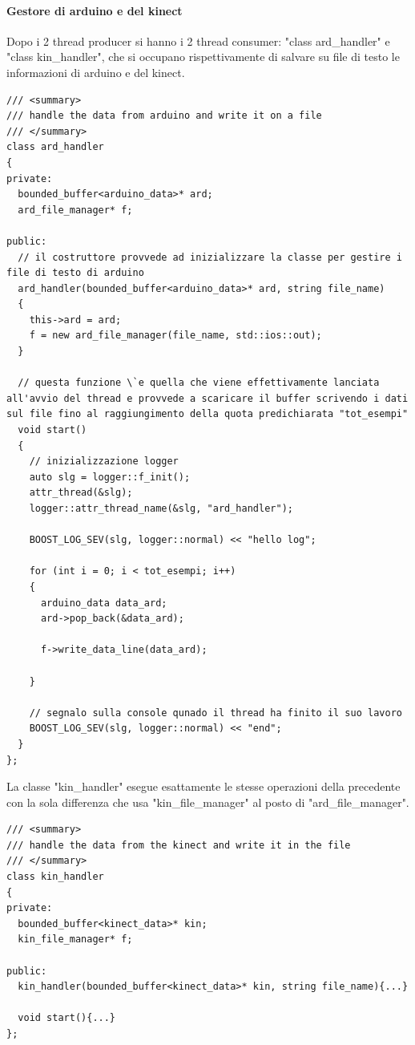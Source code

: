 \documentclass[10pt,a4paper]{article}
\begin{document}
\paragraph{Gestore di arduino e del kinect}
Dopo i 2 thread producer si hanno i 2 thread consumer: "class ard\_handler" e "class kin\_handler", che si occupano rispettivamente di salvare su file di testo le informazioni di arduino e del kinect. 
\begin{lstlisting}[style=mycpp, caption=classe ard\_handler, captionpos=b]
/// <summary>
/// handle the data from arduino and write it on a file
/// </summary>
class ard_handler
{
private:
  bounded_buffer<arduino_data>* ard;
  ard_file_manager* f;

public:
  // il costruttore provvede ad inizializzare la classe per gestire i file di testo di arduino
  ard_handler(bounded_buffer<arduino_data>* ard, string file_name)
  {
    this->ard = ard;
    f = new ard_file_manager(file_name, std::ios::out);
  }

  // questa funzione \`e quella che viene effettivamente lanciata all'avvio del thread e provvede a scaricare il buffer scrivendo i dati sul file fino al raggiungimento della quota predichiarata "tot_esempi"
  void start()
  {
	// inizializzazione logger
    auto slg = logger::f_init();
    attr_thread(&slg);
    logger::attr_thread_name(&slg, "ard_handler");

    BOOST_LOG_SEV(slg, logger::normal) << "hello log";

    for (int i = 0; i < tot_esempi; i++)
    {
      arduino_data data_ard;
      ard->pop_back(&data_ard);

      f->write_data_line(data_ard);

    }
    
	// segnalo sulla console qunado il thread ha finito il suo lavoro
    BOOST_LOG_SEV(slg, logger::normal) << "end";
  }
};
\end{lstlisting}
%
%
La classe "kin\_handler" esegue esattamente le stesse operazioni della precedente con la sola differenza che usa "kin\_file\_manager" al posto di "ard\_file\_manager".
\begin{lstlisting}[style=mycpp, caption=classe kin\_handler, captionpos=b]
/// <summary>
/// handle the data from the kinect and write it in the file
/// </summary>
class kin_handler
{
private:
  bounded_buffer<kinect_data>* kin;
  kin_file_manager* f;

public:
  kin_handler(bounded_buffer<kinect_data>* kin, string file_name){...}

  void start(){...}
};
\end{lstlisting}
%
%
\end{document}
